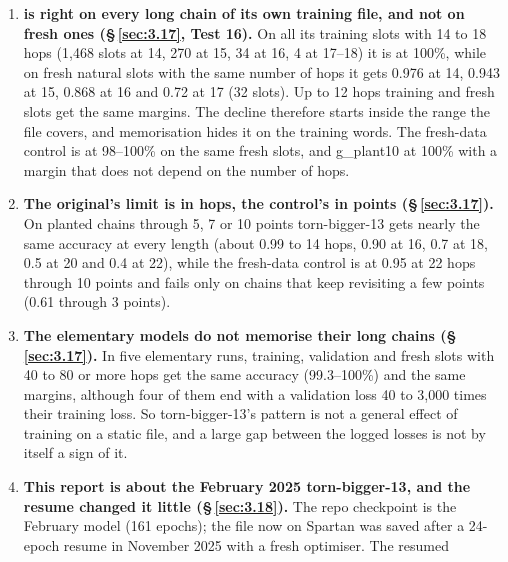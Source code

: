 \documentclass[paper=a4,fontsize=11pt,DIV=11,parskip=half,headings=small,numbers=noendperiod]{scrartcl}
\DeclareRobustCommand{\lead}[1]{\textsf{\bfseries\color{accent}#1}}
\DeclareRobustCommand{\code}[1]{{\fontseries{m}\ttfamily #1}}
\begin{document}
\begin{enumerate}
  median of 0.27); the original has its lowest value there (0.18 against 0.40). The position embeddings become
  smooth from the diagonal outwards from about step 4,000, before natural words reach 50\% (step 32,083), and
  are still smoothing at the end. The original elementary model saw 14 times as many words presented (96 epochs
  of 16M words), but \code{e\_\allowbreak{}base} saw about 7 times as many distinct words (109M against 16M).
\item \lead{\code{torn-\allowbreak{}bigger-\allowbreak{}13} is right on every long chain of its own training
  file, and not on fresh ones (\S\,\ref{sec:3.17}, Test 16).} On all its training slots with 14 to 18 hops
  (1,468 slots at 14, 270 at 15, 34 at 16, 4 at 17–18) it is at 100\%, while on fresh natural slots with the
  same number of hops it gets 0.976 at 14, 0.943 at 15, 0.868 at 16 and 0.72 at 17 (32 slots). Up to 12 hops
  training and fresh slots get the same margins. The decline therefore starts inside the range the file covers,
  and memorisation hides it on the training words. The fresh-data control is at 98–100\% on the same fresh
  slots, and \code{g\_\allowbreak{}plant10} at 100\% with a margin that does not depend on the number of hops.
\item \lead{The original’s limit is in hops, the control’s in points (\S\,\ref{sec:3.17}).} On planted chains
  through 5, 7 or 10 points \code{torn-\allowbreak{}bigger-\allowbreak{}13} gets nearly the same accuracy at
  every length (about 0.99 to 14 hops, 0.90 at 16, 0.7 at 18, 0.5 at 20 and 0.4 at 22), while the fresh-data
  control is at 0.95 at 22 hops through 10 points and fails only on chains that keep revisiting a few points
  (0.61 through 3 points).
\item \lead{The elementary models do not memorise their long chains (\S\,\ref{sec:3.17}).} In five elementary
  runs, training, validation and fresh slots with 40 to 80 or more hops get the same accuracy (99.3–100\%) and
  the same margins, although four of them end with a validation loss 40 to 3,000 times their training loss. So
  \code{torn-\allowbreak{}bigger-\allowbreak{}13}’s pattern is not a general effect of training on a static
  file, and a large gap between the logged losses is not by itself a sign of it.
\item \lead{This report is about the February 2025 \code{torn-\allowbreak{}bigger-\allowbreak{}13}, and the
  resume changed it little (\S\,\ref{sec:3.18}).} The repo checkpoint is the February model (161 epochs); the
  file now on Spartan was saved after a 24-epoch resume in November 2025 with a fresh optimiser. The resumed

\end{enumerate}
\end{document}
